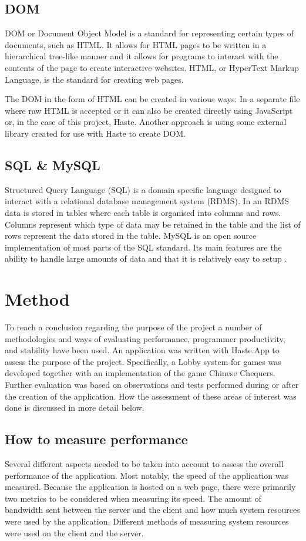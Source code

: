 \documentclass[a4paper]{article}
\begin{document}
\subsection{DOM}
DOM or Document Object Model is a standard for representing certain types of documents, such as HTML. It allows for HTML pages to be written in a hierarchical tree-like manner and it allows for programs to interact with the contents of the page to create interactive websites. HTML, or HyperText Markup Language, is the standard for creating web pages.

The DOM in the form of HTML can be created in various ways: In a separate file where raw HTML is accepted or it can also be created directly using JavaScript or, in the case of this project, Haste. Another approach is using some external library created for use with Haste to create DOM. 

\subsection{SQL \& MySQL}
Structured Query Language (SQL) is a domain specific language designed to interact with a relational database management system (RDMS). In an RDMS data is stored in tables where each table is organised into columns and rows. Columns represent which type of data may be retained in the table and the list of rows represent the data stored in the table. MySQL is an open source implementation of most parts of the SQL standard. Its main features are the ability to handle large amounts of data and that it is relatively easy to setup \cite{mysql-features}.

\section{Method}
\label{sec:method}
To reach a conclusion regarding the purpose of the project a number of methodologies and ways of evaluating performance, programmer productivity, and stability have been used. An application was written with Haste.App to assess the purpose of the project. Specifically, a Lobby system for games was developed together with an implementation of the game Chinese Chequers. Further evaluation was based on observations and tests performed during or after the creation of the application. How the assessment of these areas of interest was done is discussed in more detail below. 


\subsection{How to measure performance}
\label{sub:method-performance}
Several different aspects needed to be taken into account to assess the overall performance of the application. Most notably, the speed of the application was measured. Because the application is hosted on a web page, there were primarily two metrics to be considered when measuring its speed. The amount of bandwidth sent between the server and the client and how much system resources were used by the application. Different methods of measuring system resources were used on the client and the server.
\end{document}
